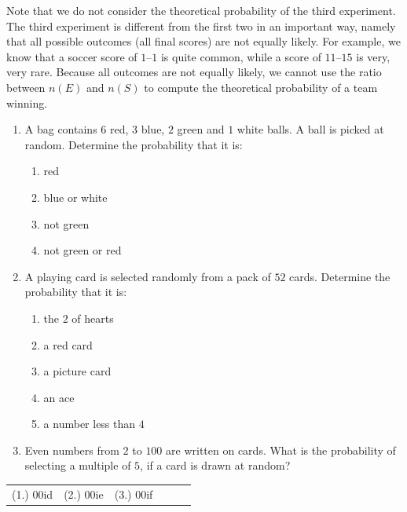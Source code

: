 Note that we do not consider the theoretical probability of the third
experiment. The third experiment is different from the first two in an
important way, namely that all possible outcomes (all final scores)
are not equally likely. For example, we know that a soccer score of
$1$--$1$ is quite common, while a score of $11$--$15$ is very, very
rare. Because all outcomes are not equally likely, we cannot use the
ratio between \(n(E)\) and \(n(S)\) to compute the theoretical
probability of a team winning. 


\begin{exercises}{}
{
  \begin{enumerate}[itemsep=5pt, label=\textbf{\arabic*}. ]
  \item 
A bag contains $6$ red, $3$ blue, $2$ green and $1$ white
    balls. A ball is picked at random. Determine the probability that it
    is:
    \begin{enumerate}[noitemsep, label=\textbf{(\alph*)} ]
    \item red
    \item blue or white
    \item not green
    \item not green or red
    \end{enumerate}
  \item 
A playing card is selected randomly from a pack of $52$
    cards. Determine the probability that it is:
    \begin{enumerate}[noitemsep, label=\textbf{(\alph*)} ]
    \item the $2$ of hearts
    \item a red card
    \item a picture card
    \item an ace
    \item a number less than $4$
    \end{enumerate}
\item Even numbers from $2$ to $100$ are written on cards. 
  What is
    the probability of selecting a multiple of $5$, if a card is drawn
    at random?

\end{enumerate}
\practiceinfo

\begin{tabular}{cccccc}
    (1.) 00id& (2.) 00ie& (3.) 00if\\
  \end{tabular}
}
\end{exercises}

